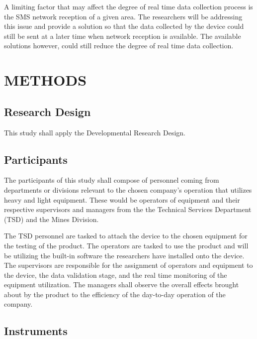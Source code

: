 \documentclass[12pt]{report}
\begin{document}
A limiting factor that may affect the degree of real time data collection process is the SMS network reception of a given area.
The researchers will be addressing this issue and provide a solution so that the data collected by the device could still be sent at a later time when network reception is available.
The available solutions however, could still reduce the degree of real time data collection.


\chapter{METHODS}

\section{Research Design}

This study shall apply the Developmental Research Design. 

\section{Participants}

The participants of this study shall compose of personnel coming from departments or divisions relevant to the chosen company's operation that utilizes heavy and light equipment. 
These would be operators of equipment and their respective supervisors and managers from the the Technical Services Department (TSD) and the Mines Division. 

The TSD personnel are tasked to attach the device to the chosen equipment for the testing of the product.
The operators are tasked to use the product and will be utilizing the built-in software the researchers have installed onto the device.
The supervisors are responsible for the assignment of operators and equipment to the device, the data validation stage, and the real time monitoring of the equipment utilization.
The managers shall observe the overall effects brought about by the product to the efficiency of the day-to-day operation of the company.

\section{Instruments}
\end{document}
